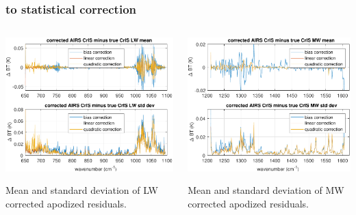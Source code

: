 \begin{frame}
\frametitle{{\airs} to {\cris} statistical correction}
\begin{columns}[t]
\begin{column}{0.5\textwidth}
  \begin{centering}
  \includegraphics[width=\textwidth]{figures/a2cris_regr_LW.pdf}
  \end{centering}\vspace{3mm}
  Mean and standard deviation of LW corrected apodized residuals.

\end{column}
\begin{column}{0.5\textwidth}
  \begin{centering}
  \includegraphics[width=\textwidth]{figures/a2cris_regr_MW.pdf}
  \end{centering}\vspace{3mm}
  Mean and standard deviation of MW corrected apodized residuals.
 
\end{column}
\end{columns}
\end{frame}
